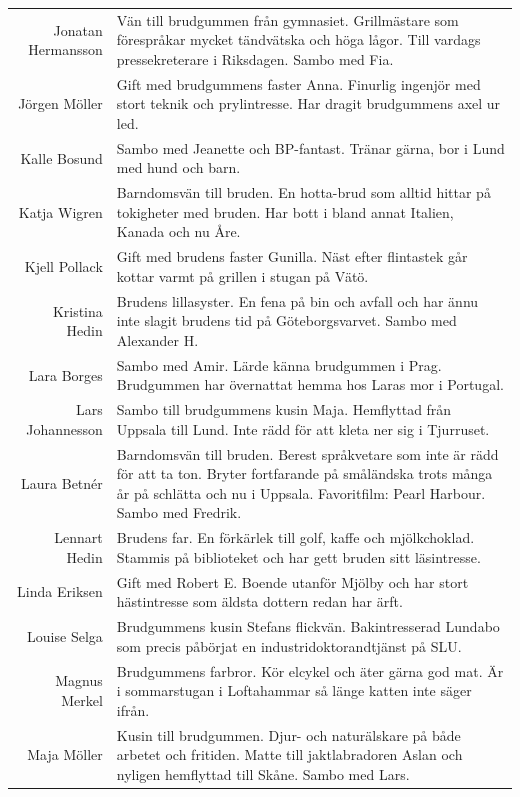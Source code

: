 \documentclass[a5paper]{article}
\begin{document}
\begin{longtable}[l]{N|L}
				Jonatan Hermansson	&	Vän till brudgummen från gymnasiet. Grillmästare som förespråkar mycket tändvätska och höga lågor. Till vardags pressekreterare i Riksdagen. Sambo med Fia.	\\
				Jörgen Möller	&	Gift med brudgummens faster Anna. Finurlig ingenjör med stort teknik och prylintresse. Har dragit brudgummens axel ur led.	\\
				Kalle Bosund	&	Sambo med Jeanette och BP-fantast. Tränar gärna, bor i Lund med hund och barn.	\\
				Katja Wigren	&	Barndomsvän till bruden. En hotta-brud som alltid hittar på tokigheter med bruden. Har bott i bland annat Italien, Kanada och nu Åre.	\\
				Kjell Pollack	&	Gift med brudens faster Gunilla. Näst efter flintastek går kottar varmt på grillen i stugan på Vätö.	\\
				Kristina Hedin	&	Brudens lillasyster. En fena på bin och avfall och har ännu inte slagit brudens tid på Göteborgsvarvet. Sambo med Alexander H.	\\
				Lara Borges	&	Sambo med Amir. Lärde känna brudgummen i Prag. Brudgummen har övernattat hemma hos Laras mor i Portugal.	\\
				Lars Johannesson	&	Sambo till brudgummens kusin Maja. Hemflyttad från Uppsala till Lund. Inte rädd för att kleta ner sig i Tjurruset.	\\
				Laura Betnér	&	Barndomsvän till bruden. Berest språkvetare som inte är rädd för att ta ton. Bryter fortfarande på småländska trots många år på schlätta och nu i Uppsala. Favoritfilm: Pearl Harbour. Sambo med Fredrik.	\\
				Lennart Hedin	&	Brudens far. En förkärlek till golf, kaffe och mjölkchoklad. Stammis på biblioteket och har gett bruden sitt läsintresse.	\\
				Linda Eriksen	&	Gift med Robert E. Boende utanför Mjölby och har stort hästintresse som äldsta dottern redan har ärft.	\\
				Louise Selga	&	Brudgummens kusin Stefans flickvän. Bakintresserad Lundabo som precis påbörjat en industridoktorandtjänst på SLU. 	\\
				Magnus Merkel	&	Brudgummens farbror. Kör elcykel och äter gärna god mat. Är i sommarstugan i Loftahammar så länge katten inte säger ifrån.	\\
				Maja Möller	&	Kusin till brudgummen. Djur- och naturälskare på både arbetet och fritiden. Matte till jaktlabradoren Aslan och nyligen hemflyttad till Skåne. Sambo med Lars.	\\

\end{longtable}
\end{document}
